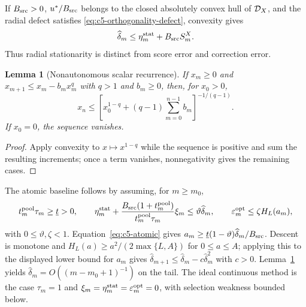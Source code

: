 \documentclass[11pt]{article}
\newtheorem{lemma}[theorem]{Lemma}
\theoremstyle{remark}\newtheorem{remark}[theorem]{Remark}
\begin{document}
If $B_{\rm src}>0$, $u^*/B_{\rm src}$ belongs to the closed absolutely convex hull of $\mathcal D_X$, and the
radial defect satisfies \eqref{eq:c5-orthogonality-defect}, convexity gives
\begin{equation}
 \widehat\delta_m\leq\eta_m^{\rm stat}+B_{\rm src}S_m^X.
 \label{eq:c5-atomic}
\end{equation}
Thus radial stationarity is distinct from score error and correction error.

\begin{lemma}[Nonautonomous scalar recurrence]
\label{lem:c5-recurrence}
If $x_m\ge0$ and $x_{m+1}\le x_m-b_mx_m^q$ with $q>1$ and $b_m\ge0$, then, for
$x_0>0$,
\begin{equation}
 x_n\le\left[x_0^{1-q}+(q-1)\sum_{m=0}^{n-1}b_m\right]^{-1/(q-1)}.
 \label{eq:c5-recurrence}
\end{equation}
If $x_0=0$, the sequence vanishes.
\end{lemma}
\begin{proof}
Apply convexity to $x\mapsto x^{1-q}$ while the sequence is positive and sum the resulting increments; once a term vanishes, nonnegativity gives the remaining cases.
\end{proof}

The atomic baseline follows by assuming, for $m\ge m_0$,
\[
 t_m^{\rm pool}\tau_m\ge\underline t>0,\qquad
 \eta_m^{\rm stat}+
 \frac{B_{\rm src}(1+t_m^{\rm pool})}{t_m^{\rm pool}\tau_m}\xi_m
 \le\vartheta\widehat\delta_m,
 \qquad\varepsilon_m^{\rm opt}\le\zeta H_L(a_m),
\]
with $0\le\vartheta,\zeta<1$. Equation~\eqref{eq:c5-atomic} gives
$a_m\ge\underline t(1-\vartheta)\widehat\delta_m/B_{\rm src}$.
Descent is monotone and $H_L(a)\ge a^2/(2\max\{L,A\})$ for $0\le a\le A$;
applying this to the displayed lower bound for $a_m$ gives
$\widehat\delta_{m+1}\le\widehat\delta_m-c\widehat\delta_m^2$ with $c>0$.
Lemma~\ref{lem:c5-recurrence} yields
$\widehat\delta_m=O((m-m_0+1)^{-1})$ on the tail. The ideal continuous method
is the case $\tau_m=1$ and $\xi_m=\eta_m^{\rm stat}=\varepsilon_m^{\rm opt}=0$,
with selection weakness bounded below.
\end{document}
